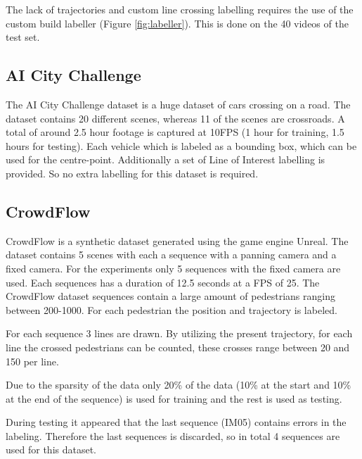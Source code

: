 The lack of trajectories and custom line crossing labelling requires the use of the custom build labeller (Figure \ref{fig:labeller}). This is done on the 40 videos of the test set.

\subsection{AI City Challenge}
The AI City Challenge dataset is a huge dataset of cars crossing on a road. The dataset contains 20 different scenes, whereas 11 of the scenes are crossroads. A total of around 2.5 hour footage is captured at 10FPS (1 hour for training, 1.5 hours for testing). Each vehicle which is labeled as a bounding box, which can be used for the centre-point. Additionally a set of Line of Interest labelling is provided. So no extra labelling for this dataset is required.


\subsection{CrowdFlow}
CrowdFlow is a synthetic dataset generated using the game engine Unreal. The dataset contains 5 scenes with each a sequence with a panning camera and a fixed camera. For the experiments only 5 sequences with the fixed camera are used. Each sequences has a duration of 12.5 seconds at a FPS of 25. The CrowdFlow dataset sequences contain a large amount of pedestrians ranging between 200-1000. For each pedestrian the position and trajectory is labeled. 

For each sequence 3 lines are drawn. By utilizing the present trajectory, for each line the crossed pedestrians can be counted, these crosses range between 20 and 150 per line.

Due to the sparsity of the data only 20\% of the data (10\% at the start and 10\% at the end of the sequence) is used for training and the rest is used as testing. 

During testing it appeared that the last sequence (IM05) contains errors in the labeling. Therefore the last sequences is discarded, so in total 4 sequences are used for this dataset.